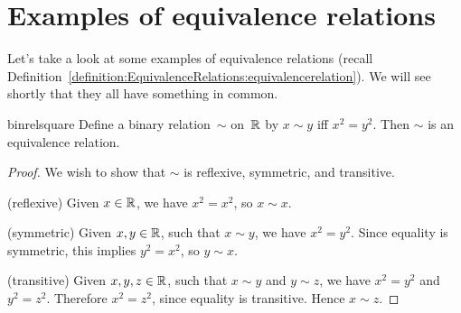 
\section{Examples of equivalence relations\quad{}} 
\label{sec:EquivalenceRelations:ExampleEquivRel}

Let's take a look at some examples of equivalence relations (recall Definition~\ref{definition:EquivalenceRelations:equivalencerelation}). We will see shortly that they all have something in common.

\begin{example}{binrelsquare}
Define a binary relation~$\sim$ on~$\mathbb{R}$ by $x \sim y$ iff $x^2 = y^2$. Then $\sim$ is an equivalence relation.

\begin{proof}
We wish to show that $\sim$ is reflexive, symmetric, and transitive.

\noindent
(reflexive) Given $x \in \mathbb{R} $, we have $x^2 = x^2$, so $x \sim x$.

\noindent
(symmetric) Given $x,y \in \mathbb{R}$, such that $x \sim y$, we have $x^2 = y^2$. Since equality is symmetric, this implies $y^2 = x^2$, so $y \sim x$.

\noindent
(transitive) Given $x,y,z \in \mathbb{R}$, such that $x \sim y$ and $y \sim z$, we have $x^2 = y^2$ and $y^2 = z^2$. Therefore $x^2 = z^2$, since equality is transitive. Hence $x \sim z$.
\end{proof}
\end{example}




